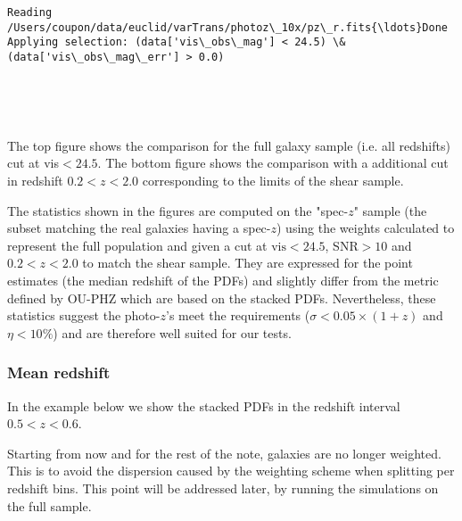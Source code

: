 \documentclass[11pt]{article}
\begin{document}
    \begin{Verbatim}[commandchars=\\\{\}]
Reading /Users/coupon/data/euclid/varTrans/photoz\_10x/pz\_r.fits{\ldots}Done
Applying selection: (data['vis\_obs\_mag'] < 24.5) \& (data['vis\_obs\_mag\_err'] > 0.0)

    \end{Verbatim}

    \begin{center}
    \end{center}
    { \hspace*{\fill} \\}
    
    \begin{center}
    \end{center}
    { \hspace*{\fill} \\}
    
    The top figure shows the comparison for the full galaxy sample (i.e. all
redshifts) cut at vis\(<24.5\). The bottom figure shows the comparison
with a additional cut in redshift \(0.2<z<2.0\) corresponding to the
limits of the shear sample.

The statistics shown in the figures are computed on the "spec-\(z\)"
sample (the subset matching the real galaxies having a spec-\(z\)) using
the weights calculated to represent the full population and given a cut
at \(\mathrm{vis}<24.5\), SNR\(>10\) and \(0.2<z<2.0\) to match the
shear sample. They are expressed for the point estimates (the median
redshift of the PDFs) and slightly differ from the metric defined by
OU-PHZ which are based on the stacked PDFs. Nevertheless, these
statistics suggest the photo-\(z\)'s meet the requirements
(\(\sigma < 0.05\times(1+z)\) and \(\eta < 10\%\)) and are therefore
well suited for our tests.

\subsubsection{Mean redshift}\label{mean-redshift}

In the example below we show the stacked PDFs in the redshift interval
\(0.5<z<0.6\).

Starting from now and for the rest of the note, galaxies are no longer
weighted. This is to avoid the dispersion caused by the weighting scheme
when splitting per redshift bins. This point will be addressed later, by
running the simulations on the full sample.
\end{document}
